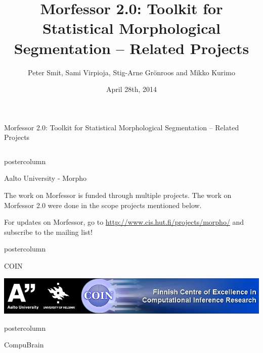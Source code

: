 \documentclass[final]{beamer} %
\title{Morfessor 2.0: Toolkit for Statistical Morphological Segmentation -- Related Projects}
\author{Peter Smit, Sami Virpioja, Stig-Arne Gr\"onroos and Mikko Kurimo}
\institute[Aalto University]{Aalto University}
\date{April 28th, 2014}
\newcommand{\collspace}{\vspace{6mm}}
\begin{document}
  \begin{frame}{Morfessor 2.0: Toolkit for Statistical Morphological Segmentation -- Related Projects} 
\begin{columns}



\begin{column}{.49\textwidth}
  \begin{beamercolorbox}[center,wd=\textwidth]{postercolumn}
 \begin{block}{Aalto University  - Morpho}

The work on Morfessor is funded through multiple projects. The work on Morfessor 2.0 were done in the scope projects mentioned below.

For updates on Morfessor, go to  \url{http://www.cis.hut.fi/projects/morpho/}  and subscribe to the mailing list!

%


            \end{block}
            
	\end{beamercolorbox}
\vfill
\collspace

  \begin{beamercolorbox}[center,wd=\textwidth]{postercolumn}
 \begin{block}{COIN}
\vspace{1cm}

              \includegraphics[width=\textwidth]{coinbanner}            
            \end{block}
            
	\end{beamercolorbox}
\vfill

\collspace
  \begin{beamercolorbox}[center,wd=\textwidth]{postercolumn}
 \begin{block}{CompuBrain}


\end{block}
\end{beamercolorbox}
\end{column}
\end{columns}
\end{frame}
\end{document}
